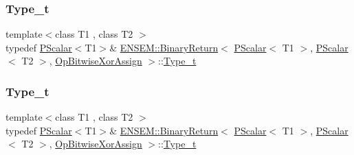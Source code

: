 \subsubsection{\texorpdfstring{Type\_t}{Type\_t}\hspace{0.1cm}{\footnotesize\ttfamily [1/3]}}
{\footnotesize\ttfamily template$<$class T1 , class T2 $>$ \\
typedef \mbox{\hyperlink{classENSEM_1_1PScalar}{P\+Scalar}}$<$T1$>$\& \mbox{\hyperlink{structENSEM_1_1BinaryReturn}{E\+N\+S\+E\+M\+::\+Binary\+Return}}$<$ \mbox{\hyperlink{classENSEM_1_1PScalar}{P\+Scalar}}$<$ T1 $>$, \mbox{\hyperlink{classENSEM_1_1PScalar}{P\+Scalar}}$<$ T2 $>$, \mbox{\hyperlink{structENSEM_1_1OpBitwiseXorAssign}{Op\+Bitwise\+Xor\+Assign}} $>$\+::\mbox{\hyperlink{structENSEM_1_1BinaryReturn_3_01PScalar_3_01T1_01_4_00_01PScalar_3_01T2_01_4_00_01OpBitwiseXorAssign_01_4_ad0194688bf01b3c6a40e163fb5235e3c}{Type\+\_\+t}}}

\mbox{\label{structENSEM_1_1BinaryReturn_3_01PScalar_3_01T1_01_4_00_01PScalar_3_01T2_01_4_00_01OpBitwiseXorAssign_01_4_ad0194688bf01b3c6a40e163fb5235e3c}} 
\subsubsection{\texorpdfstring{Type\_t}{Type\_t}\hspace{0.1cm}{\footnotesize\ttfamily [2/3]}}
{\footnotesize\ttfamily template$<$class T1 , class T2 $>$ \\
typedef \mbox{\hyperlink{classENSEM_1_1PScalar}{P\+Scalar}}$<$T1$>$\& \mbox{\hyperlink{structENSEM_1_1BinaryReturn}{E\+N\+S\+E\+M\+::\+Binary\+Return}}$<$ \mbox{\hyperlink{classENSEM_1_1PScalar}{P\+Scalar}}$<$ T1 $>$, \mbox{\hyperlink{classENSEM_1_1PScalar}{P\+Scalar}}$<$ T2 $>$, \mbox{\hyperlink{structENSEM_1_1OpBitwiseXorAssign}{Op\+Bitwise\+Xor\+Assign}} $>$\+::\mbox{\hyperlink{structENSEM_1_1BinaryReturn_3_01PScalar_3_01T1_01_4_00_01PScalar_3_01T2_01_4_00_01OpBitwiseXorAssign_01_4_ad0194688bf01b3c6a40e163fb5235e3c}{Type\+\_\+t}}}

